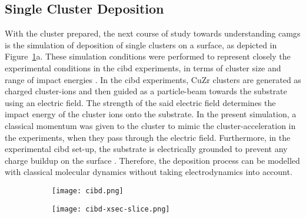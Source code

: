 \subsection{Single Cluster Deposition}
\begin{changebar}
With the cluster prepared, the next course of study towards understanding \gls{camg}s is the simulation of deposition of single clusters on a surface, as depicted in Figure~\ref{f:cibdsmod}a. These simulation conditions were performed to represent closely the experimental conditions in the \gls{cibd} experiments, in terms of cluster size and range of impact energies \cite{Benel2018,Benel2019}. In the \gls{cibd} experiments, CuZr clusters are generated as charged cluster-ions and then guided as a particle-beam towards the substrate using an electric field. The strength of the said electric field determines the impact energy of the cluster ions onto the substrate.  In the present simulation, a classical momentum was given to the cluster to mimic the cluster-acceleration in the experiments, when they pass through the electric field. Furthermore, in the experimental \gls{cibd} set-up, the substrate is electrically grounded to prevent any charge buildup on the surface \cite{Fischer2015}. Therefore, the deposition process can be modelled with classical molecular dynamics without taking electrodynamics into account. \par

\begin{figure}[h]
	\centering
\begin{subfigure}{0.45\textwidth}
	\texttt{[image: cibd.png]}
	\caption{}
\end{subfigure}%
\hspace{1cm}
\begin{subfigure}{0.45\textwidth}
	\texttt{[image: cibd-xsec-slice.png]}
	\caption{}
\end{subfigure}
\label{f:cibdsmod}
\end{figure} 


\end{changebar}
